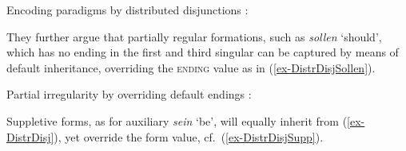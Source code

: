 \documentclass[output=paper
 	        ,biblatex
                ,babelshorthands
                ,newtxmath
                ,draftmode
                ,colorlinks, citecolor=brown
]{langscibook}
\newcommand{\mathplus}{{\normalfont +}}
\begin{document}


  
\ea
\label{ex-DistrDisj}
Encoding paradigms by distributed disjunctions \citep[105]{Krieger:Nerbonne:93}:\\
\z  


They further argue that partially regular formations, such as
\textit{sollen} `should', which has no ending in the first and third
singular can be captured by means of default inheritance, overriding
the \textsc{ending} value as in (\ref{ex-DistrDisjSollen}).  

\ea
\label{ex-DistrDisjSollen}

Partial irregularity by overriding default endings \citep[105]{Krieger:Nerbonne:93}:\\
\z

Suppletive forms, as for auxiliary \textit{sein} `be', will equally
inherit from (\ref{ex-DistrDisj}), yet override the form value,
cf.\ (\ref{ex-DistrDisjSupp}).  
\end{document}
